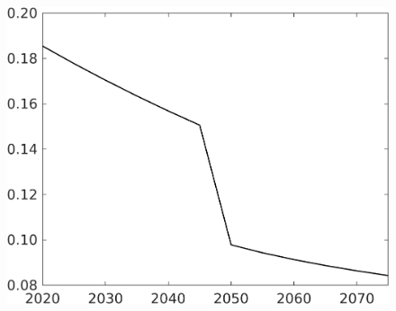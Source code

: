 \begin{figure}[h!!]
\begin{minipage}[]{0.32\textwidth}
	\end{minipage}		
	\begin{minipage}[]{0.32\textwidth}
		\includegraphics[width=1\textwidth]{../../codding_model/own_basedOnFried/optimalPol_010922_revision/figures/all_13Sept22/CompTaufPER_bytaul_Reg0_EY_spillover0_nsk0_xgr0_knspil0_sep0_LFlimit1_emsbase0_countec0_GovRev0_etaa0.79_lgd0.png}
	\end{minipage}	
\end{figure} 

